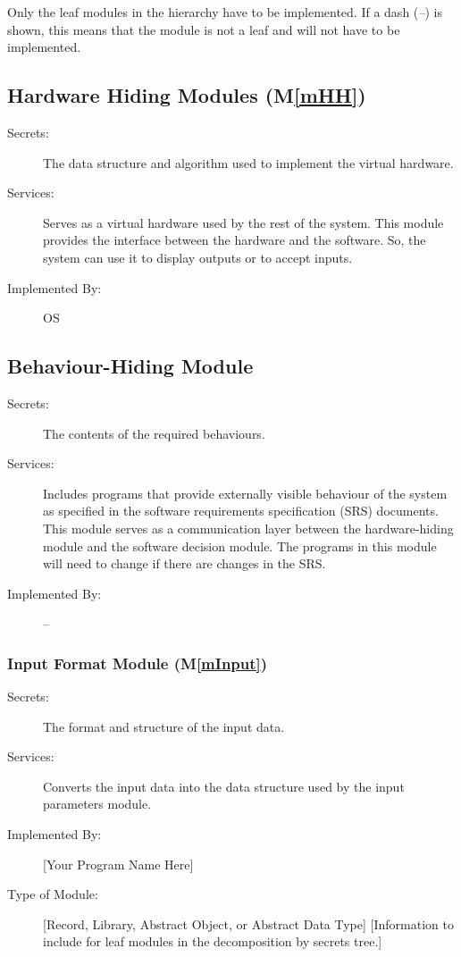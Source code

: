 \documentclass[12pt, titlepage]{article}
\newcommand{\mref}[1]{M\ref{#1}}
\begin{document}
Only the leaf modules in the hierarchy have to be implemented. If a dash
(\emph{--}) is shown, this means that the module is not a leaf and will not have
to be implemented.

\subsection{Hardware Hiding Modules (\mref{mHH})}

\begin{description}
\item[Secrets:]The data structure and algorithm used to implement the virtual
  hardware.
\item[Services:]Serves as a virtual hardware used by the rest of the
  system. This module provides the interface between the hardware and the
  software. So, the system can use it to display outputs or to accept inputs.
\item[Implemented By:] OS
\end{description}

\subsection{Behaviour-Hiding Module}

\begin{description}
\item[Secrets:]The contents of the required behaviours.
\item[Services:]Includes programs that provide externally visible behaviour of
  the system as specified in the software requirements specification (SRS)
  documents. This module serves as a communication layer between the
  hardware-hiding module and the software decision module. The programs in this
  module will need to change if there are changes in the SRS.
\item[Implemented By:] --
\end{description}

\subsubsection{Input Format Module (\mref{mInput})}

\begin{description}
\item[Secrets:]The format and structure of the input data.
\item[Services:]Converts the input data into the data structure used by the
  input parameters module.
\item[Implemented By:] [Your Program Name Here]
\item[Type of Module:] [Record, Library, Abstract Object, or Abstract Data Type]
  [Information to include for leaf modules in the decomposition by secrets tree.]
\end{description}
\end{document}

